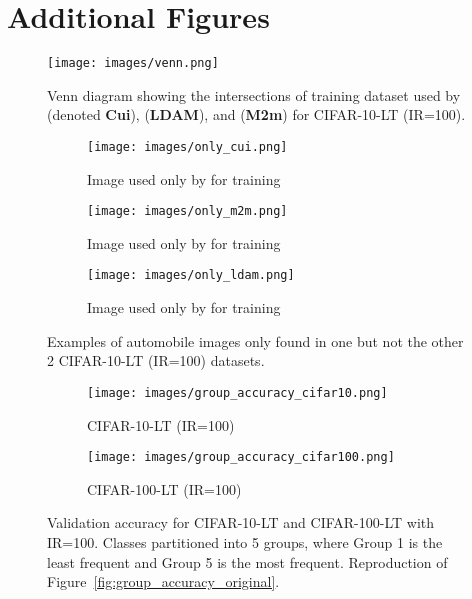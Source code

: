 \newpage
\section{Additional Figures}


\begin{figure}[!ht]
    \centering
    \texttt{[image: images/venn.png]}
    \caption{Venn diagram showing the intersections of training dataset used by \citet{ClassBalancedLoss} (denoted \textbf{Cui}), \citet{LDAM-DRW} (\textbf{LDAM}), and \citet{M2m} (\textbf{M2m}) for CIFAR-10-LT (IR=100).}
    \label{fig:cifar10_indices_venn}
\end{figure}


\begin{figure}[!ht]
    \centering
    \begin{subfigure}[b]{0.3\textwidth}
        \centering
        \texttt{[image: images/only\_cui.png]}
        \caption{Image used only by \citet{ClassBalancedLoss} for training}
        \label{fig:cui_unique}
    \end{subfigure}
    \hfill
    \begin{subfigure}[b]{0.3\textwidth}
        \centering
        \texttt{[image: images/only\_m2m.png]}
        \caption{Image used only by \citet{M2m} for training}
        \label{fig:m2m_unique}
    \end{subfigure}
    \hfill
    \begin{subfigure}[b]{0.3\textwidth}
        \centering
        \texttt{[image: images/only\_ldam.png]}
        \caption{Image used only by \citet{LDAM-DRW} for training}
        \label{fig:ldam_unique}
    \end{subfigure}
    \caption{Examples of automobile images only found in one but not the other 2 CIFAR-10-LT (IR=100) datasets.}
    \label{fig:cifar10_indices_differences}
\end{figure}



\begin{figure}[!ht]
    \centering
    \begin{subfigure}[b]{0.49\textwidth}
        \centering
        \texttt{[image: images/group\_accuracy\_cifar10.png]}
        \caption{CIFAR-10-LT (IR=100)}
        \label{fig:group_accuracy_cifar10}
    \end{subfigure}
    \hfill
    \begin{subfigure}[b]{0.49\textwidth}
        \centering
        \texttt{[image: images/group\_accuracy\_cifar100.png]}
        \caption{CIFAR-100-LT (IR=100)}
        \label{fig:group_accuracy_cifar100}
    \end{subfigure}
    \caption{Validation accuracy for CIFAR-10-LT and CIFAR-100-LT with IR=100. Classes partitioned into 5 groups, where Group 1 is the least frequent and Group 5 is the most frequent. Reproduction of Figure~\ref{fig:group_accuracy_original}.}
    \label{fig:group_accuracy}
\end{figure}


